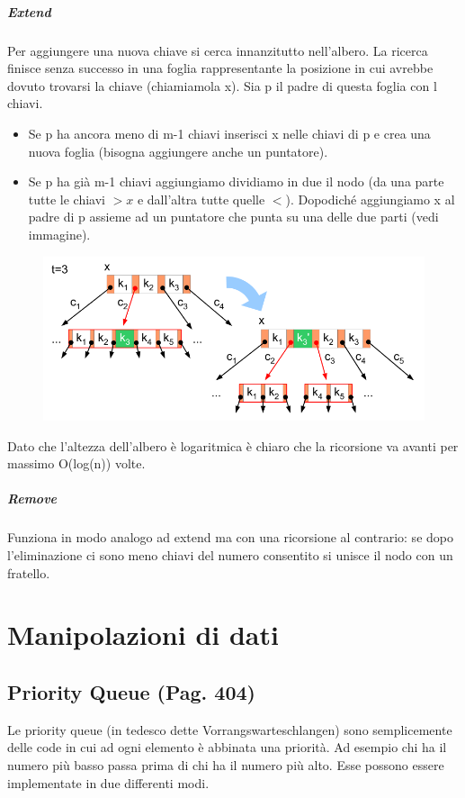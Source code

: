 \documentclass[a4paper]{book}
\begin{document}
\paragraph{Extend}
Per aggiungere una nuova chiave si cerca innanzitutto nell'albero. La ricerca finisce senza successo in una foglia rappresentante la posizione in cui avrebbe dovuto trovarsi la chiave (chiamiamola x). Sia p il padre di questa foglia con l chiavi. 
\begin{itemize}
\item Se p ha ancora meno di m-1 chiavi inserisci x nelle chiavi di p e crea una nuova foglia (bisogna aggiungere anche un puntatore).
\item Se p ha già m-1 chiavi aggiungiamo  dividiamo in due il nodo (da una parte tutte le chiavi $>x$ e dall'altra tutte quelle $<$). Dopodiché aggiungiamo x al padre di p assieme ad un puntatore che punta su una delle due parti (vedi immagine). 
\end{itemize}
\begin{figure}[H]
\centering
\includegraphics[scale=0.5]{Figures/bbaumadd.png}
\end{figure}
Dato che l'altezza dell'albero è logaritmica è chiaro che la ricorsione va avanti per massimo O(log(n)) volte.
\paragraph{Remove}
Funziona in modo analogo ad extend ma con una ricorsione al contrario: se dopo l'eliminazione ci sono meno chiavi del numero consentito si unisce il nodo con un fratello.
\chapter{Manipolazioni di dati}
\section{Priority Queue (Pag. 404)}
Le priority queue (in tedesco dette Vorrangswarteschlangen) sono semplicemente delle code in cui ad ogni elemento è abbinata una priorità. Ad esempio chi ha il numero più basso passa prima di chi ha il numero più alto. Esse possono essere implementate in due differenti modi.
\end{document}
